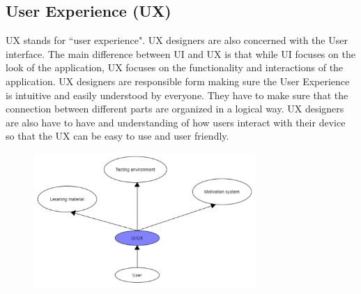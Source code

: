 \documentclass[10pt,twoside,english,a4paper]{article}
\begin{document}
\subsection{User Experience (UX)}
UX stands for ``user experience". UX designers are also concerned with the User interface. \cite{theymakedesign_2019_what}
The main difference between UI and UX is that while UI focuses on the look of the application,
UX focuses on the functionality and interactions of the application. UX designers are 
responsible form making sure the User Experience is intuitive and easily understood by everyone.
They have to make sure that the connection between different parts are organized in a logical way.
UX designers are also have to have and understanding of how users interact with their
device so that the UX can be easy to use and user friendly. \cite{theymakedesign_2019_what}










\begin{figure}
\includegraphics[width=0.75\textwidth]{images/diagram-crop.pdf}
\end{figure}
\end{document}
